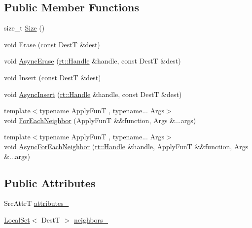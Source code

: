 \subsection*{Public Member Functions}
\begin{DoxyCompactItemize}
\item 
size\-\_\-t \hyperlink{classshad_1_1AttrEdgesPair_a9e599e9cd0f48c8f43f601ff2964c518}{Size} ()
\item 
void \hyperlink{classshad_1_1AttrEdgesPair_afa9b9a09795c87ca9c9cc345ddad917e}{Erase} (const Dest\-T \&dest)
\item 
void \hyperlink{classshad_1_1AttrEdgesPair_af51bbca5c672249e3d4365fe56504880}{Async\-Erase} (\hyperlink{classshad_1_1rt_1_1Handle}{rt\-::\-Handle} \&handle, const Dest\-T \&dest)
\item 
void \hyperlink{classshad_1_1AttrEdgesPair_aeec4a60aa7a4b93b62ff8f38774e6709}{Insert} (const Dest\-T \&dest)
\item 
void \hyperlink{classshad_1_1AttrEdgesPair_a1f9ee442c101737b9ceb03c74e4ea78a}{Async\-Insert} (\hyperlink{classshad_1_1rt_1_1Handle}{rt\-::\-Handle} \&handle, const Dest\-T \&dest)
\item 
{\footnotesize template$<$typename Apply\-Fun\-T , typename... Args$>$ }\\void \hyperlink{classshad_1_1AttrEdgesPair_aa18443674f98afa01f346cd3b84086eb}{For\-Each\-Neighbor} (Apply\-Fun\-T \&\&function, Args \&...args)
\item 
{\footnotesize template$<$typename Apply\-Fun\-T , typename... Args$>$ }\\void \hyperlink{classshad_1_1AttrEdgesPair_ab6c5c1f21f98e09b581e920b37a89325}{Async\-For\-Each\-Neighbor} (\hyperlink{classshad_1_1rt_1_1Handle}{rt\-::\-Handle} \&handle, Apply\-Fun\-T \&\&function, Args \&...args)
\end{DoxyCompactItemize}
\subsection*{Public Attributes}
\begin{DoxyCompactItemize}
\item 
Src\-Attr\-T \hyperlink{classshad_1_1AttrEdgesPair_a6296cb2ead29362d2a52f3c5ccef58a1}{attributes\-\_\-}
\item 
\hyperlink{classshad_1_1LocalSet}{Local\-Set}$<$ Dest\-T $>$ \hyperlink{classshad_1_1AttrEdgesPair_a2c1c5d3fac6714fdbff5d0edabf0b334}{neighbors\-\_\-}
\end{DoxyCompactItemize}


